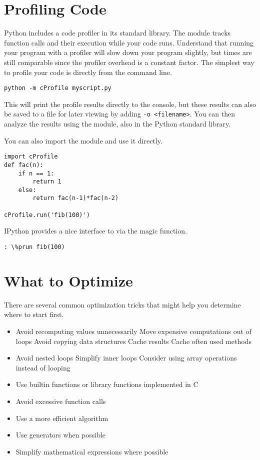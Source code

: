 \section*{Profiling Code}
Python includes a code profiler in its standard library. 
The  module tracks function calls and their execution while your code runs.
Understand that running your program with a profiler will slow down your program slightly, but times are still comparable since the profiler overhead is a constant factor.
The simplest way to profile your code is directly from the command line.
\begin{lstlisting}
python -m cProfile myscript.py
\end{lstlisting}
This will print the profile results directly to the console, but these results can also be saved to a file for later viewing by adding \texttt{-o <filename>}.
You can then analyze the results using the  module, also in the Python standard library.

You can also import the  module and use it directly.
\begin{lstlisting}
import cProfile
def fac(n):
    if n == 1:
        return 1
    else:
        return fac(n-1)*fac(n-2)

cProfile.run('fib(100)')
\end{lstlisting}

IPython provides a nice interface to  via the  magic function.
\begin{lstlisting}
: \%prun fib(100)
\end{lstlisting}


\section*{What to Optimize}
There are several common optimization tricks that might help you determine where to start first.
\begin{itemize}
\item Avoid recomputing values unnecessarily
    \subitem Move expensive computations out of loops
    \subitem Avoid copying data structures
    \subitem Cache results
    \subitem Cache often used methods
\item Avoid nested loops
    \subitem Simplify inner loops
    \subitem Consider using array operations instead of looping
\item Use builtin functions or library functions implemented in C
\item Avoid excessive function calls
\item Use a more efficient algorithm
\item Use generators when possible
\item Simplify mathematical expressions where possible
\end{itemize}

